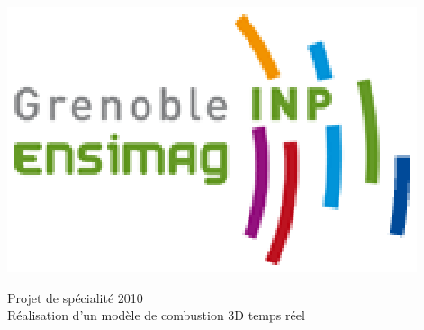 \documentclass[a4paper,10pt]{article}
\begin{document}


\begin{center}
	\hspace{3cm}
	\includegraphics[scale=0.8]{logo.ps}

	\vspace{1cm}
	{\large Projet de spécialité 2010}\\
	{\Large Réalisation d'un modèle de combustion 3D temps réel}\\
	\vspace{1cm}



\end{center}
\end{document}
